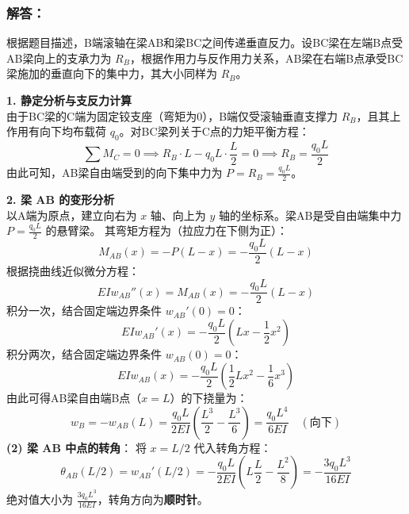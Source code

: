 \documentclass[11pt,a4paper]{ctexrep}
\begin{document}
{\begin{center}
\end{center}

\subsubsection*{解答：}

根据题目描述，B端滚轴在梁AB和梁BC之间传递垂直反力。设BC梁在左端B点受AB梁向上的支承力为 $R_B$，根据作用力与反作用力关系，AB梁在右端B点承受BC梁施加的垂直向下的集中力，其大小同样为 $R_B$。

\textbf{1. 静定分析与支反力计算} \\
由于BC梁的C端为固定铰支座（弯矩为0），B端仅受滚轴垂直支撑力 $R_B$，且其上作用有向下均布载荷 $q_0$。对BC梁列关于C点的力矩平衡方程：
\[
    \sum M_C = 0 \implies R_B \cdot L - q_0 L \cdot \frac{L}{2} = 0 \implies R_B = \frac{q_0 L}{2}
\]
由此可知，AB梁自由端受到的向下集中力为 $P = R_B = \frac{q_0 L}{2}$。

\textbf{2. 梁 AB 的变形分析} \\
以A端为原点，建立向右为 $x$ 轴、向上为 $y$ 轴的坐标系。梁AB是受自由端集中力 $P = \frac{q_0 L}{2}$ 的悬臂梁。
其弯矩方程为（拉应力在下侧为正）：
\[
    M_{AB}(x) = -P(L - x) = -\frac{q_0 L}{2}(L - x)
\]
根据挠曲线近似微分方程：
\[
    EI w_{AB}''(x) = M_{AB}(x) = -\frac{q_0 L}{2}(L - x)
\]
积分一次，结合固定端边界条件 $w_{AB}'(0) = 0$：
\[
    EI w_{AB}'(x) = -\frac{q_0 L}{2}\left( L x - \frac{1}{2} x^2 \right)
\]
积分两次，结合固定端边界条件 $w_{AB}(0) = 0$：
\[
    EI w_{AB}(x) = -\frac{q_0 L}{2}\left( \frac{1}{2} L x^2 - \frac{1}{6} x^3 \right)
\]
由此可得AB梁自由端B点（$x=L$）的下挠量为：
\[
    w_B = -w_{AB}(L) = \frac{q_0 L}{2EI} \left( \frac{L^3}{2} - \frac{L^3}{6} \right) = \frac{q_0 L^4}{6EI} \quad (\text{向下})
\]
\textbf{(2) 梁 AB 中点的转角}：
将 $x = L/2$ 代入转角方程：
\[
    \theta_{AB}(L/2) = w_{AB}'(L/2) = -\frac{q_0 L}{2EI} \left( L \frac{L}{2} - \frac{L^2}{8} \right) = -\frac{3 q_0 L^3}{16 EI}
\]
绝对值大小为 \textbf{$\frac{3 q_0 L^3}{16 EI}$}，转角方向为\textbf{顺时针}。

}
\end{document}
